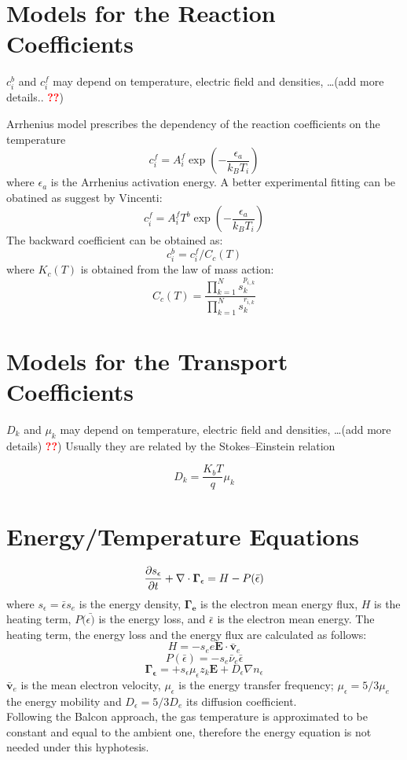 \documentclass[11pt]{amsart}
\begin{document}
\section{Models for the Reaction Coefficients}

$c^{b}_i$ and $c^{f}_i$ may depend on temperature, electric field and densities, \dots(add more details.. \textcolor{red}{\textbf{??}})

Arrhenius model prescribes the dependency of the reaction coefficients on the temperature
$$
c^{f}_i = A^{f}_{i} \exp\left( -\dfrac{\epsilon_a}{k_B T_{i}} \right)
$$
where $\epsilon_a$ is the Arrhenius activation energy.
A better experimental fitting can be obatined as suggest by Vincenti:
$$
c^{f}_i =A^{f}_{i} T^b \exp\left( -\dfrac{\epsilon_a}{k_B T_{i}} \right)
$$
The backward coefficient can be obtained as:
$$
c^{b}_i= c^{f}_i/C_c(T)  
$$
where $K_c(T)$ is obtained from the law of mass action:
$$
C_c(T)= \frac{\prod_{k=1}^N s_k^{p_{i,k}}}{\prod_{k=1}^N s_k^{r_{i,k}}}
$$

\section{Models for the Transport Coefficients}

$D_{k}$ and $\mu_{k}$ may depend on temperature, electric field and densities, \dots(add more details)
\textcolor{red}{\textbf{??}})
Usually they are related by the Stokes--Einstein relation 

$$
D_{k} = \dfrac{K_{b} T}{q} \mu_{k}
$$

\section{Energy/Temperature Equations}
$$
\frac{\partial s_\epsilon}{\partial t} + \nabla\cdot{\mathbf{{\Gamma_\epsilon}}} = H - P(\bar{\epsilon})
$$
where $s_\epsilon = \bar{\epsilon} s_e$ is the energy density, $\mathbf{\Gamma_e}$ is the electron mean energy flux, $H$ is the heating term, $P(\bar{\epsilon)}$ is the energy loss, and $\bar{\epsilon}$ is the electron mean energy.
The heating term, the energy loss and the energy flux are calculated as follows:
$$
H=-s_e e \mathbf{E} \cdot  \mathbf{\bar{v}}_e
$$ 
$$
P(\bar{\epsilon})=-s_e\bar{\nu}_e\bar{\epsilon}
$$
$$
\mathbf{\Gamma_\epsilon}= +s_\epsilon \mu_\epsilon z_k \mathbf{E} + D_\epsilon\nabla n_\epsilon
$$    
$\mathbf{\bar{v}}_e$ is the mean electron velocity, $\mu_\epsilon$ is the energy transfer frequency;
$\mu_\epsilon = 5/3\mu_e$ the energy mobility and $D_\epsilon = 5/3 D_e$ its diffusion coefficient.\\
Following the Balcon approach, the gas temperature is approximated to be constant and equal to the ambient one, therefore the energy equation is not needed under this hyphotesis.
\end{document}
